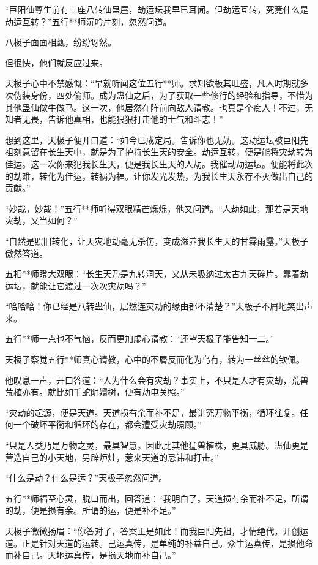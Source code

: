 \begin{this_body}
“巨阳仙尊生前有三座八转仙蛊屋，劫运坛我早已耳闻。但劫运互转，究竟什么是劫运互转？”五行**师沉吟片刻，忽然问道。

八极子面面相觑，纷纷讶然。

但很快，他们就反应过来。

天极子心中不禁感慨：“早就听闻这位五行**师。求知欲极其旺盛，凡人时期就多次伪装身份，四处偷师。成为蛊仙之后，为了获取一些修行的经验和指导，不惜为其他蛊仙做牛做马。这一次，他居然在阵前向敌人请教。也真是个痴人！不过，无知者无畏，告诉他真相，也能狠狠打击他的士气和斗志！”

想到这里，天极子便开口道：“如今已成定局。告诉你也无妨。这劫运坛被巨阳先祖刻意留在长生天中，就是为了护持长生天的安全。劫运互转，便是能将灾劫转为佳运。这一次你来犯我长生天，便是我长生天的人劫。我催动劫运坛。便能将此次的劫难，转化为佳运，转祸为福。让你发光发热，为我长生天永存不灭做出自己的贡献。”

“妙哉，妙哉！”五行**师听得双眼精芒烁烁，他又问道。“人劫如此，那若是天地灾劫，又当如何？”

“自然是照旧转化，让天灾地劫毫无杀伤，变成滋养我长生天的甘霖雨露。”天极子傲然答道。

五相**师瞪大双眼：“长生天乃是九转洞天，又从未吸纳过太古九天碎片。靠着劫运坛，就能让它渡过一次次灾劫吗？”

“哈哈哈！你已经是八转蛊仙，居然连灾劫的缘由都不清楚？”天极子不屑地笑出声来。

五行**师一点也不气恼，反而更加虚心请教：“还望天极子能告知一二。”

天极子察觉五行**师真心请教，心中的不屑反而化为乌有，转为一丝丝的钦佩。

他叹息一声，开口答道：“人为什么会有灾劫？事实上，不只是人才有灾劫，荒兽荒植亦有。就比如千蛇阴嬛树，便有劫电关照。”

“灾劫的起源，便是天道。天道损有余而补不足，最讲究万物平衡，循环往复。任何一个破坏平衡和循环的存在，都会遭受灾劫照顾。”

“只是人类乃是万物之灵，最具智慧。因此比其他猛兽植株，更具威胁。蛊仙更是营造自己的小天地，另辟炉灶，惹来天道的忌讳和打击。”

“什么是劫？什么是运？”天极子忽然问道。

五行**师福至心灵，脱口而出，回答道：“我明白了。天道损有余而补不足，所谓的劫，便是损有余。所谓的运，便是补不足。”

天极子微微扬眉：“你答对了，答案正是如此！而我巨阳先祖，才情绝代，开创运道。正是针对天道的运转。己运真传，是单纯的补益自己。众生运真传，是损他命而补自己。天地运真传，是损天地而补自己。”


\end{this_body}
